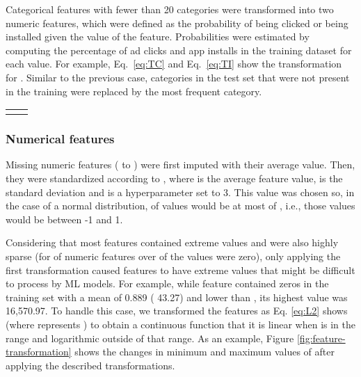 \documentclass[manuscript,nonacm]{acmart}
\begin{document}
Categorical features with fewer than 20 categories were transformed into two numeric features, which were defined as the probability of being clicked or being installed given the value of the feature. Probabilities were estimated by computing the percentage of ad clicks and app installs in the training dataset for each value. For example, Eq.~\ref{eq:TC} and Eq.~\ref{eq:TI} show the transformation for . Similar to the previous case, categories in the test set that were not present in the training were replaced by the most frequent category.\vspace{-0.75cm}





\begin{table}[H]
    \centering
   
\begin{tabular}{cc}

 
& 


    \end{tabular}\vspace{-0.5cm}
   
\end{table}

\subsubsection*{\textbf{Numerical features}}\hfill 

Missing numeric features ( to ) were first imputed with their average value. Then, they were standardized according to , where  is the average feature value,  is the standard deviation and  is a hyperparameter set to 3. This value was chosen so, in the case of a normal distribution,  of values would be at most  of , i.e., those values would be between -1 and 1.

Considering that most features contained extreme values and were also highly sparse (for  of numeric features over  of the values were zero), only applying the first transformation caused features to have extreme values that might be difficult to process by ML models. For example, while feature  contained  zeros in the training set with a mean of 0.889 ( 43.27) and  lower than , its highest value was 16,570.97. To handle this case, we transformed the features as Eq. \ref{eq:L2} shows (where  represents ) to obtain a continuous function that it is linear when  is in the range  and logarithmic outside of that range. As an example, Figure \ref{fig:feature-transformation} shows the changes in minimum and maximum values of  after applying the described transformations.\vspace{-0.3cm}
\end{document}
